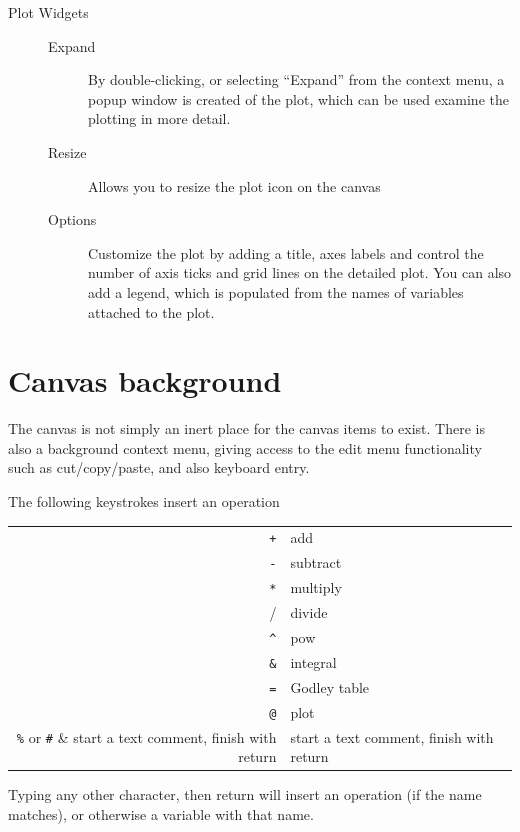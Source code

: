 \begin{description}
\item[Plot Widgets]\mbox{}
\begin{description}
\item[Expand]
By double-clicking, or selecting ``Expand'' from the context menu, a
popup window is created of the plot, which can be used examine the
plotting in more detail.

\item[Resize] Allows you to resize the plot icon on the canvas
\item[Options] Customize the plot by adding a title, axes labels and
  control the number of axis ticks and grid lines on the detailed
  plot. You can also add a legend, which is populated from the names
  of variables attached to the plot.
\end{description}

\end{description}

\section{Canvas background}

The canvas is not simply an inert place for the canvas items to
exist. There is also a background context menu, giving access to the
edit menu functionality such as cut/copy/paste, and also keyboard entry.

The following keystrokes insert an operation

\begin{tabular}{rl}
\verb-+- & add\\
\verb+-+ & subtract \\
\verb+*+ & multiply\\
\verb++/ & divide\\
\verb+^+ & pow\\
\verb+&+ & integral\\
\verb+=+ & Godley table\\
\verb+@+ & plot\\
\verb+%+ or \verb+#+ & start a text comment, finish with return\\
\end{tabular}

Typing any other character, then return will insert an operation (if
the name matches), or otherwise a variable with that name.
